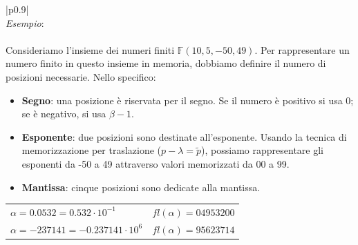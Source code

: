 \documentclass{article}
\numberwithin{equation}{section}
\newenvironment{example}
{\begin{center}
        \begin{tabular}{|p{0.9\textwidth}|}
            \hline \\ 
            \textit{Esempio}: \\\\ 
        }
        {
            \\\\ \hline
        \end{tabular}
    \end{center}
}
\begin{document}
\newpage
\begin{example}
   Consideriamo l'insieme dei numeri finiti $\mathbb{F}(10,5,-50,49)$. Per
   rappresentare un numero finito in questo insieme in memoria, dobbiamo
   definire il numero di posizioni necessarie. Nello specifico:
   \begin{itemize}
       \item\textbf{Segno}: una posizione è riservata per il segno. Se il numero
           è positivo si usa 0; se è negativo, si usa $\beta-1$.
        \item\textbf{Esponente}: due posizioni sono destinate all'esponente.
            Usando la tecnica di memorizzazione per traslazione
            ($p-\lambda=\tilde{p}$), possiamo
            rappresentare gli esponenti da -50 a 49 attraverso valori
            memorizzati da 00 a 99.
        \item\textbf{Mantissa}: cinque posizioni sono dedicate alla mantissa.
   \end{itemize}
   \begin{center}
        \begin{tabular}{ll}
            $\alpha=0.0532=0.532\cdot10^{-1}$ & $fl(\alpha)=04953200$\\ 
            $\alpha=-237141=-0.237141\cdot10^{6}$ & $fl(\alpha)=95623714$
        \end{tabular}
   \end{center}
\end{example}
\end{document}

